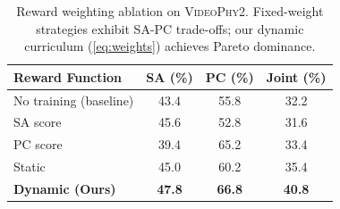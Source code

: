 \begin{table}[t]
  \centering
  \caption{Reward weighting ablation on \textsc{VideoPhy2}.
           Fixed-weight strategies exhibit SA-PC trade-offs;
           our dynamic curriculum (\cref{eq:weights}) achieves Pareto dominance.}
  \label{tab:reward_ablation}
  \vspace{0.05in}
  \small
  \begin{tabular}{lccc}
    \toprule
    \textbf{Reward Function} & \textbf{SA (\%)} & \textbf{PC (\%)} & \textbf{Joint (\%)} \\
    \midrule
    No training (baseline)     & 43.4 & 55.8 & 32.2 \\
    \midrule
    SA score              & 45.6 & 52.8 & 31.6 \\
    PC score              & 39.4 & 65.2 & 33.4 \\
    Static         & 45.0 & 60.2 & 35.4 \\
    \midrule
    \textbf{Dynamic (Ours)}    & \textbf{47.8} & \textbf{66.8} & \textbf{40.8} \\
    \bottomrule
  \end{tabular}
\end{table}
